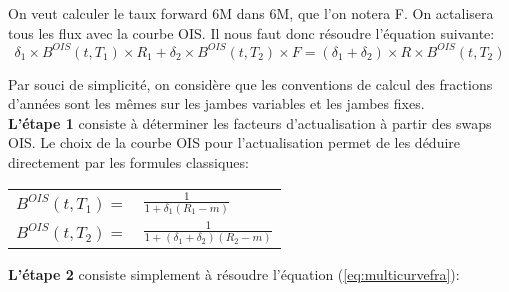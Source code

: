 \documentclass{article}
\begin{document}
On veut calculer le taux forward 6M dans 6M, que l'on notera F. On actalisera tous les flux avec la courbe OIS. Il nous faut donc résoudre l'équation suivante:\\
\begin{equation}
\label{eq:multicurvefra}
\delta_1 \times B^{OIS}(t,T_1) \times R_1 + \delta_2 \times B^{OIS}(t,T_2) \times F = (\delta_1 + \delta_2) \times R \times B^{OIS}(t,T_2)
\end{equation}

Par souci de simplicité, on considère que les conventions de calcul des fractions d'années sont les mêmes sur les jambes variables et les jambes fixes.\\

\textbf{L'étape 1} consiste à déterminer les facteurs d'actualisation à partir des swaps OIS. Le choix de la courbe OIS pour l'actualisation permet de les déduire directement par les formules classiques: 

\begin{center}
\begin{tabular}{r l}
$B^{OIS}(t,T_1)=$ & $\frac{1}{1+\delta_1 (R_1-m)}$ \\
$B^{OIS}(t,T_2)=$ & $\frac{1}{1+(\delta_1 + \delta_2) (R_2-m)}$ \\
\end{tabular}
\end{center}

\textbf{L'étape 2} consiste simplement à résoudre l'équation (\ref{eq:multicurvefra}):\\
\end{document}
